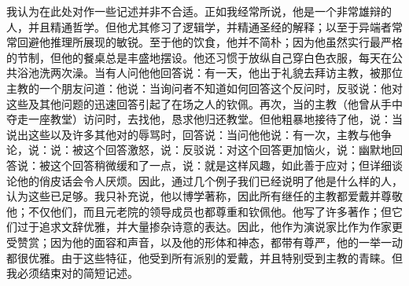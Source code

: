 我认为在此处对作一些记述并非不合适。正如我经常所说，他是一个非常雄辩的人，并且精通哲学。但他尤其修习了逻辑学，并精通圣经的解释；以至于异端者常常回避他推理所展现的敏锐。至于他的饮食，他并不简朴；因为他虽然实行最严格的节制，但他的餐桌总是丰盛地摆设。他还习惯于放纵自己穿白色衣服，每天在公共浴池洗两次澡。当有人问他他回答说：有一天，他出于礼貌去拜访主教，被那位主教的一个朋友问道：他说：当询问者不知道如何回答这个反问时，反驳说：他对这些及其他问题的迅速回答引起了在场之人的钦佩。再次，当的主教（他曾从手中夺走一座教堂）访问时，去找他，恳求他归还教堂。但他粗暴地接待了他，说：当说出这些以及许多其他对的辱骂时，回答说：当问他他说：有一次，主教与他争论，说：说：被这个回答激怒，说：反驳说：对这个回答更加恼火，说：幽默地回答说：被这个回答稍微缓和了一点，说：就是这样风趣，如此善于应对；但详细谈论他的俏皮话会令人厌烦。因此，通过几个例子我们已经说明了他是什么样的人，认为这些已足够。我只补充说，他以博学著称，因此所有继任的主教都爱戴并尊敬他；不仅他们，而且元老院的领导成员也都尊重和钦佩他。他写了许多著作；但它们过于追求文辞优雅，并大量掺杂诗意的表达。因此，他作为演说家比作为作家更受赞赏；因为他的面容和声音，以及他的形体和神态，都带有尊严，他的一举一动都很优雅。由于这些特征，他受到所有派别的爱戴，并且特别受到主教的青睐。但我必须结束对的简短记述。\par

